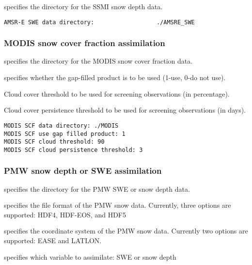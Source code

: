  
  specifies the directory for the
 SSMI snow depth data.
 

 \begin{Verbatim}[frame=single]
AMSR-E SWE data directory:                  ./AMSRE_SWE
 \end{Verbatim}
 

 
 \subsubsection{MODIS snow cover fraction assimilation}
 \label{sssec:modisscfda}
 

 
  specifies the directory for
 the MODIS snow cover fraction data.

  specifies whether 
 the gap-filled product is to be used (1-use, 0-do not use).

  Cloud cover threshold to be 
 used for screening observations (in percentage).

  Cloud cover persistence
 threshold to be used for screening observations (in days).
 

 \begin{Verbatim}[frame=single]
MODIS SCF data directory: ./MODIS
MODIS SCF use gap filled product: 1
MODIS SCF cloud threshold: 90
MODIS SCF cloud persistence threshold: 3
 \end{Verbatim}

 
 \subsubsection{PMW snow depth or SWE assimilation}
 \label{sssec:pmwsnowdepthda}
 

 
  specifies the directory for the
 PMW SWE or snow depth data.

  specifies 
 the file format of the PMW snow data. Currently, three options
 are supported: HDF4, HDF-EOS, and HDF5

  specifies 
 the coordinate system of the PMW snow data. Currently two options
 are supported: EASE and LATLON.

  specifies which variable
 to assimilate: SWE or snow depth

